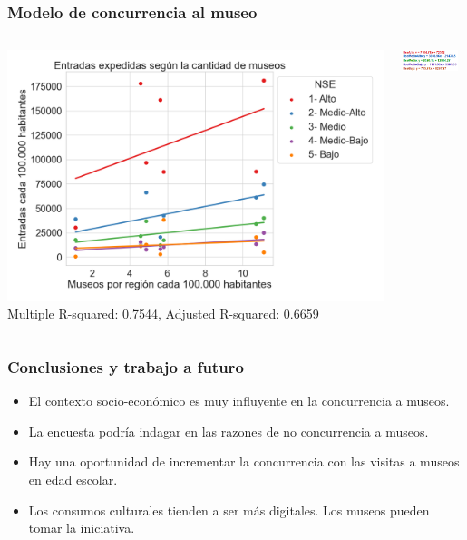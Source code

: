 \documentclass[10pt]{beamer}
\begin{document}
\begin{frame}
  \frametitle{Modelo de concurrencia al museo}
  \begin{columns}
    \includegraphics[height=0.9\textheight]{modelo_entrada_museo}
    Multiple R-squared: 0.7544, Adjusted R-squared: 0.6659

    \includegraphics[width=0.9\textwidth]{rectas.png}
  \end{columns}


\end{frame}


\begin{frame}
  \frametitle{Conclusiones y trabajo a futuro}
    \begin{itemize}
      \item El contexto socio-económico es muy influyente en la concurrencia a museos.
      \item La encuesta podría indagar en las razones de no concurrencia a museos.
      \item Hay una oportunidad de incrementar la concurrencia con las visitas a museos en edad escolar.
      \item Los consumos culturales tienden a ser más digitales. Los museos pueden tomar la iniciativa.
    \end{itemize}
\end{frame}
\end{document}
